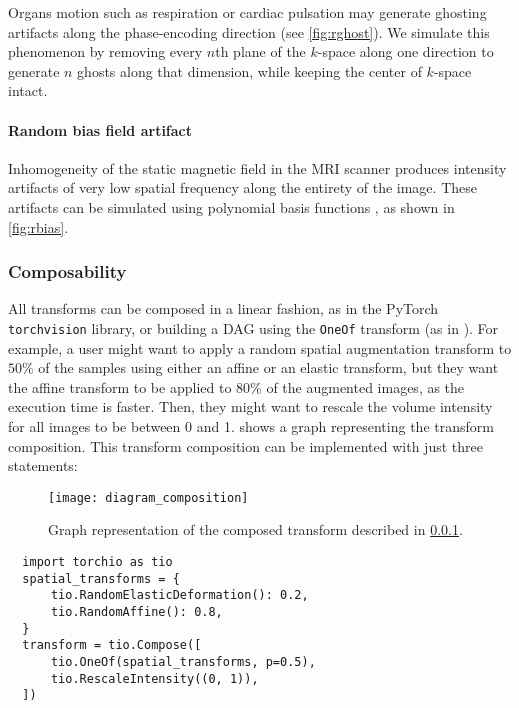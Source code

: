 Organs motion such as respiration or cardiac pulsation may generate ghosting
artifacts along the phase-encoding direction \cite{zhuo_mr_2006}
(see \cref{fig:rghost}).
%
We simulate this phenomenon by removing every $n$th plane of the $k$-space along
one direction to generate $n$ ghosts along that dimension,
while keeping the center of $k$-space intact.


\paragraph{Random bias field artifact}

Inhomogeneity of the static magnetic field in the \ac{MRI} scanner produces
intensity artifacts of very low spatial frequency
along the entirety of the image.
%
These artifacts can be simulated using polynomial basis
functions \cite{van_leemput_automated_1999},
as shown in \cref{fig:rbias}.




\subsubsection{Composability}
\label{sec:composability}

All transforms can be composed in a linear fashion,
as in the PyTorch \texttt{torchvision} library,
or building a \ac{DAG}
using the \texttt{OneOf} transform
(as in \cite{buslaev_albumentations_2020}).
%
For example, a user might want to apply a random spatial augmentation transform
to $50\%$ of the samples using either an affine or an elastic transform,
but they want the affine transform to be applied to $80\%$ of the augmented
images, as the execution time is faster.
%
Then, they might want to rescale the volume intensity for all images
to be between 0 and 1.
%
 shows a graph representing the transform composition.
%
This transform composition can be implemented with just three statements:




\begin{figure}
    \centering
    \texttt{[image: diagram\_composition]}
    \caption{%
        Graph representation of the composed transform
        described in \cref{sec:composability}.
    }
    \label{fig:dag}
\end{figure}

\begin{verbatim}
  import torchio as tio
  spatial_transforms = {
      tio.RandomElasticDeformation(): 0.2,
      tio.RandomAffine(): 0.8,
  }
  transform = tio.Compose([
      tio.OneOf(spatial_transforms, p=0.5),
      tio.RescaleIntensity((0, 1)),
  ])
\end{verbatim}


